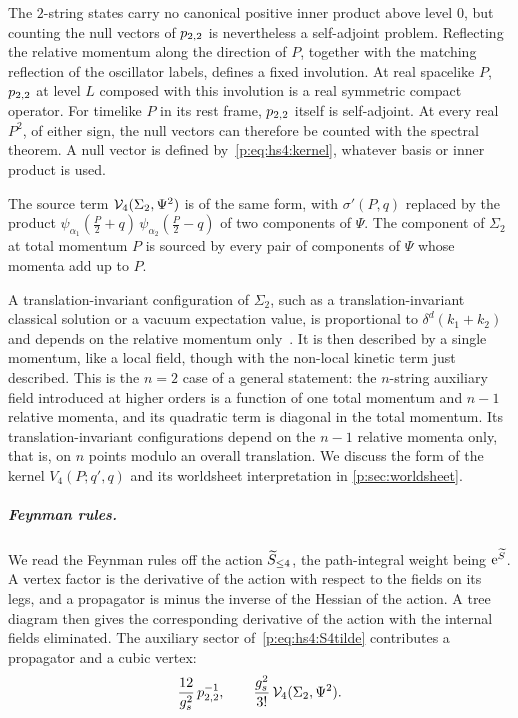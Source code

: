 The $2$-string states carry no canonical positive inner product above level $0$, but counting the null vectors of $\sprod{2}{2}$ is nevertheless a self-adjoint problem.
  Reflecting the relative momentum along the direction of $P$, together with the matching reflection of the oscillator labels, defines a fixed involution.
  At real spacelike $P$, $\sprod{2}{2}$ at level $L$ composed with this involution is a real symmetric compact operator.
  For timelike $P$ in its rest frame, $\sprod{2}{2}$ itself is self-adjoint.
  At every real $P^2$, of either sign, the null vectors can therefore be counted with the spectral theorem.
  A null vector is defined by~\eqref{p:eq:hs4:kernel}, whatever basis or inner product is used.

The source term $\vertex{4}(\Sigma_2, \Psi^2)$ is of the same form, with $\sigma'(P, q)$ replaced by the product $\psi_{\alpha_1}(\tfrac{P}{2} + q) \, \psi_{\alpha_2}(\tfrac{P}{2} - q)$ of two components of $\Psi$.
The component of $\Sigma_2$ at total momentum $P$ is sourced by every pair of components of $\Psi$ whose momenta add up to $P$.

A translation-invariant configuration of $\Sigma_2$, such as a translation-invariant classical solution or a vacuum expectation value, is proportional to $\delta^d(k_1 + k_2)$ and depends on the relative momentum only~\cite{Weinberg:2005:QuantumTheoryFields-2}.
It is then described by a single momentum, like a local field, though with the non-local kinetic term just described.
This is the $n = 2$ case of a general statement: the $n$-string auxiliary field introduced at higher orders is a function of one total momentum and $n - 1$ relative momenta, and its quadratic term is diagonal in the total momentum.
Its translation-invariant configurations depend on the $n - 1$ relative momenta only, that is, on $n$ points modulo an overall translation.
We discuss the form of the kernel $V_4(P; q', q)$ and its worldsheet interpretation in \cref{p:sec:worldsheet}.


\subparagraph{Feynman rules.}

We read the Feynman rules off the action $\caction[\le 4]$, the path-integral weight being $\e^{\caction}$.
A vertex factor is the derivative of the action with respect to the fields on its legs, and a propagator is minus the inverse of the Hessian of the action.
A tree diagram then gives the corresponding derivative of the action with the internal fields eliminated.
The auxiliary sector of~\eqref{p:eq:hs4:S4tilde} contributes a propagator and a cubic vertex:
\begin{equation}
  \label{p:eq:hs4:feynman-rules}
  \frac{12}{\gs^2} \, \sprod{2}{2}^{-1},
  \qquad
  \frac{\gs^2}{3!} \, \vertex{4}(\Sigma_2, \Psi^2).
\end{equation}

